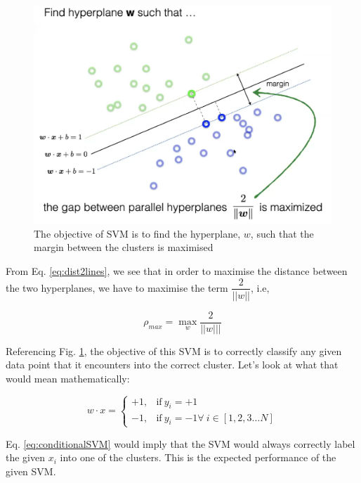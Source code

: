 \documentclass[11pt]{article}
\begin{document}
\begin{figure}[h]
    \centering
    \includegraphics[scale=0.28]{figures/marginHyperplane.png}
    \caption{The objective of SVM is to find the hyperplane, $w$, such that the margin between the clusters is maximised}
    \label{fig:hyperPlaneMargin}
\end{figure}

From Eq. \ref{eq:dist2lines}, we see that in order to maximise the distance between the two hyperplanes, we have to maximise the term $\dfrac{2}{||w||}$, i.e,

\begin{equation}
    \rho_{max} = \max_{w} \dfrac{2}{||w|||}
\end{equation}

Referencing Fig. \ref{fig:hyperPlaneMargin}, the objective of this SVM is to correctly classify any given data point that it encounters into the correct cluster. 
Let's look at what that would mean mathematically:

\begin{equation}\label{eq:conditionalSVM}
    w \cdot x  = 
    \begin{cases}
    +1, & \text{if}\ y_{i} = +1 \\
    -1, & \text{if}\ y_{i} = -1 \forall\ i \in [1, 2, 3 \dots N]
    \end{cases}
\end{equation}

Eq. \ref{eq:conditionalSVM} would imply that the SVM would always correctly label the given $x_{i}$ into one of the clusters. This is the expected performance of the given SVM.
\end{document}
